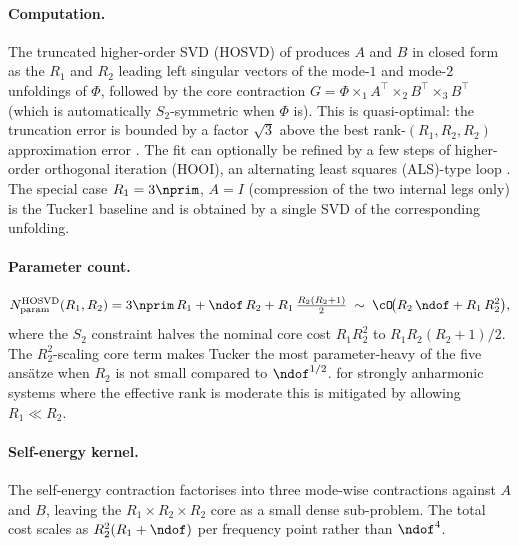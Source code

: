 \paragraph{Computation.} The truncated higher-order SVD (HOSVD) of
\citet{de_lathauwer_multilinear_2000} produces $A$ and $B$ in closed form as the $R_1$ and $R_2$
leading left singular vectors of the mode-$1$ and mode-$2$ unfoldings of $\Phi$, followed by the
core contraction $G = \Phi\times_1 A^\top\times_2 B^\top\times_3 B^\top$ (which is automatically
$S_2$-symmetric when $\Phi$ is). This is quasi-optimal: the truncation error is bounded by a
factor $\sqrt{3}$ above the best rank-$(R_1,R_2,R_2)$ approximation error
\cite{hackbusch_tensor_2019, oseledets_tensor-train_2011}. The fit can optionally be refined by a
few steps of higher-order orthogonal iteration (HOOI), an alternating least squares (ALS)-type loop
 \cite{de_lathauwer_best_2000}. The special case $R_1=3\nprim$, $A=I$ (compression of the two
internal legs only) is the Tucker1 baseline and is obtained by a single SVD of the corresponding
unfolding.

\paragraph{Parameter count.}
\begin{equation}\label{eq:fc3_tucker_params}
  N_{\mathrm{param}}^{\mathrm{HOSVD}}(R_1,R_2)
  = 3\nprim\,R_1 + \ndof\,R_2 + R_1\,\tfrac{R_2(R_2+1)}{2}
  \;\sim\; \cO\!\bigl(R_2\,\ndof + R_1\,R_2^{2}\bigr),
\end{equation}
where the $S_2$ constraint halves the nominal core cost $R_1 R_2^{2}$ to $R_1 R_2(R_2+1)/2$.
The $R_2^{2}$-scaling core term makes Tucker the most parameter-heavy of the five ans\"atze
when $R_2$ is not small compared to $\ndof^{1/2}$. for strongly anharmonic systems where the
effective rank is moderate this is mitigated by allowing $R_1\ll R_2$.

\paragraph{Self-energy kernel.} The self-energy contraction factorises into three mode-wise
contractions against $A$ and $B$, leaving the $R_1\times R_2\times R_2$ core as a small dense
sub-problem. The total cost scales as $R_2^{2}(R_1+\ndof)$ per frequency point rather than
$\ndof^{4}$.

